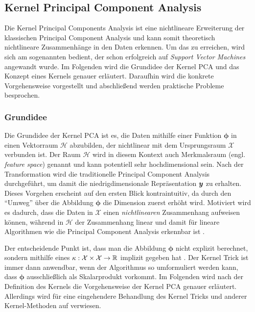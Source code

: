 \subsection{Kernel Principal Component Analysis}
\label{ch:MethodenDerDimRed:statistisch:kPCA}
Die Kernel Principal Components Analysis \parencite{Scholkopf.1997} ist eine nichtlineare Erweiterung der klassischen Principal Component
Analysis und kann somit theoretisch nichtlineare Zusammenhänge in den Daten erkennen. Um das zu
erreichen, wird sich am sogenannten  bedient, der schon erfolgreich auf
\textit{Support Vector Machines} \parencite{Boser.1992} angewandt wurde. Im Folgenden wird die Grundidee der Kernel PCA und das Konzept
eines Kernels genauer erläutert. Daraufhin wird die konkrete Vorgehensweise vorgestellt und
abschließend werden praktische Probleme besprochen.

\subsubsection{Grundidee}
\label{ch:MethodenDerDimRed:statistisch:kPCA:Grundidee}

Die Grundidee der Kernel PCA ist es, die Daten mithilfe einer Funktion $\bm{\phi}$ in einen
Vektorraum $\mathcal{H}$ abzubilden, der nichtlinear mit dem Ursprungsraum $\mathcal{X}$ verbunden
ist. Der Raum $\mathcal{H}$ wird in diesem Kontext auch Merkmalsraum (engl. \textit{feature space})
genannt und kann potentiell sehr hochdimensional sein. Nach der Transformation wird die
traditionelle Principal Component Analysis durchgeführt, um damit die niedrigdimensionale
Repräsentation $\bm{y}$ zu erhalten. Dieses Vorgehen erscheint auf den ersten Blick
kontraintuitiv, da durch den \enquote{Umweg} über die Abbildung $\bm{\phi}$ die Dimension zuerst
erhöht wird. Motiviert wird es dadurch, dass die Daten in $\mathcal{X}$ einen
\textit{nichtlinearen} Zusammenhang aufweisen können, während in $\mathcal{H}$ der Zusammenhang
linear und damit für lineare Algorithmen wie die Principal Component Analysis erkennbar ist \parencite[vgl.][26]{ShaweTaylor.2011}.

Der entscheidende Punkt ist, dass man die Abbildung $\bm{\phi}$ nicht explizit berechnet, sondern
mithilfe eines  $\kappa: \mathcal{X} \times \mathcal{X} \rightarrow \mathbb{R}$
implizit gegeben hat \parencites[586 -- 588]{Bishop.2006}[583]{Scholkopf.1997}. Der Kernel Trick ist immer dann anwendbar,
wenn der Algorithmus so umformuliert werden kann, dass $\bm{\phi}$ ausschließlich als Skalarprodukt
vorkommt. Im Folgenden wird nach der Definition des Kernels die Vorgehensweise der Kernel PCA
genauer erläutert. Allerdings wird für eine eingehendere Behandlung des Kernel Tricks und anderer
Kernel-Methoden auf \textcite{ShaweTaylor.2011} verwiesen.

